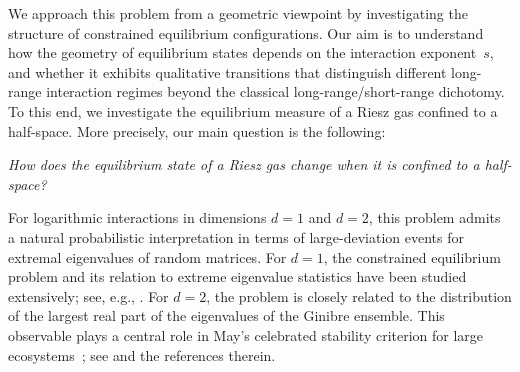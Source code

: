 \documentclass{amsart}
\theoremstyle{plain}
\theoremstyle{remark}
\numberwithin{equation}{section}
\begin{document}
We approach this problem from a geometric
viewpoint by investigating the structure of constrained equilibrium
configurations. 
Our aim is to understand how the geometry of equilibrium states depends on the interaction exponent~$s$, and whether it exhibits qualitative transitions that distinguish different long-range interaction regimes beyond the classical long-range/short-range dichotomy.  
To this end, we investigate the equilibrium measure of a Riesz gas confined to
a half-space. More precisely, our main question is the following:
\begin{center}
\emph{How does the equilibrium state of a Riesz gas change when it is confined to a half-space?}
\end{center} 
For logarithmic interactions in
dimensions $d=1$ and $d=2$, this problem admits a natural probabilistic
interpretation in terms of large-deviation events for extremal
eigenvalues of random matrices. 
For $d=1$, the constrained equilibrium problem and its relation
to extreme eigenvalue statistics have been studied extensively; see, e.g., 
\cite{DM06,DM08,MNSV09,BDG01,KC10,RKC12,MV09,FW12,MS14,MNSV11}. For $d=2$, the problem is closely related to the distribution of the
largest real part of the eigenvalues of the Ginibre ensemble. This observable plays a central role in May's celebrated stability criterion for large ecosystems~\cite{May72}; see \cite{BLO26,XZ24} and the references therein.
\end{document}
